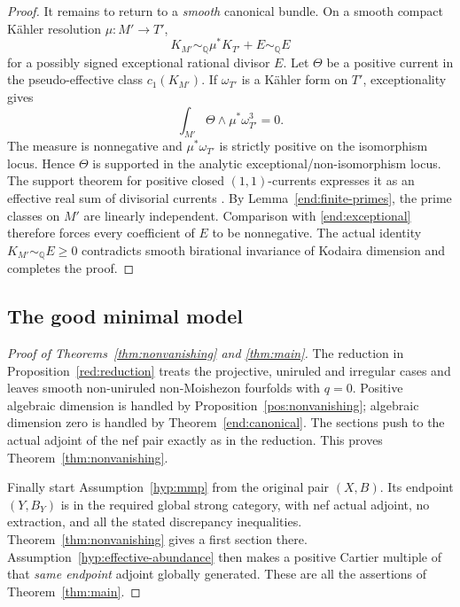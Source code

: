 \documentclass[11pt,letterpaper]{article}
\theoremstyle{definition}
\theoremstyle{remark}
\begin{document}
\begin{proof}
It remains to return to a \emph{smooth} canonical bundle. On a
smooth compact K\"ahler resolution \(\mu:M'\to T'\),
\begin{equation}\label{end:exceptional}
 K_{M'}\sim_{\mathbb{Q}}\mu^*K_{T'}+E\sim_{\mathbb{Q}}E
\end{equation}
for a possibly signed exceptional rational divisor \(E\). Let
\(\Theta\) be a positive current in the pseudo-effective class
\(c_1(K_{M'})\). If \(\omega_{T'}\) is a K\"ahler form on
\(T'\), exceptionality gives
\[
 \int_{M'}\Theta\wedge\mu^*\omega_{T'}^3=0.
\]
The measure is nonnegative and \(\mu^*\omega_{T'}\) is strictly
positive on the isomorphism locus. Hence \(\Theta\) is supported
in the analytic exceptional/non-isomorphism locus. The support
theorem for positive closed \((1,1)\)-currents expresses it as an
effective real sum of divisorial currents
\cite{DemaillyComplexAnalyticGeometry}. By
Lemma~\ref{end:finite-primes}, the prime classes on \(M'\) are
linearly independent. Comparison with \eqref{end:exceptional}
therefore forces every coefficient of \(E\) to be nonnegative.
The actual identity \(K_{M'}\sim_{\mathbb{Q}}E\ge0\) contradicts
smooth birational invariance of Kodaira dimension and completes
the proof.
\end{proof}

\subsection{The good minimal model}

\begin{proof}[Proof of Theorems~\ref{thm:nonvanishing} and
\ref{thm:main}]
The reduction in Proposition~\ref{red:reduction} treats the
projective, uniruled and irregular cases and leaves smooth
non-uniruled non-Moishezon fourfolds with \(q=0\). Positive
algebraic dimension is handled by Proposition~\ref{pos:nonvanishing};
algebraic dimension zero is handled by
Theorem~\ref{end:canonical}. The sections push to the actual
adjoint of the nef pair exactly as in the reduction. This proves
Theorem~\ref{thm:nonvanishing}.

Finally start Assumption~\ref{hyp:mmp} from the original pair
\((X,B)\). Its endpoint \((Y,B_Y)\) is in the required global
strong category, with nef actual adjoint, no extraction, and all the
stated discrepancy inequalities. Theorem~\ref{thm:nonvanishing}
gives a first section there. Assumption~\ref{hyp:effective-abundance}
then makes a positive Cartier multiple of that \emph{same endpoint}
adjoint globally generated. These are all the assertions of
Theorem~\ref{thm:main}.
\end{proof}
\end{document}
